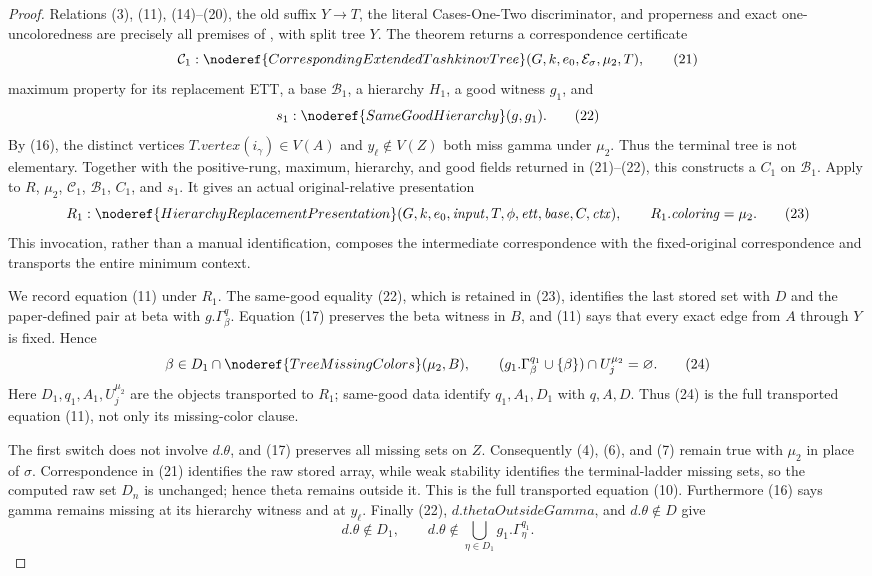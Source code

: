\begin{proof}
Relations (3), (11), (14)--(20), the old suffix $Y\to T$, the literal
Cases-One-Two discriminator, and properness and exact
one-uncoloredness are precisely all premises of
, with split tree $Y$.  The
theorem returns a correspondence certificate
\[
 \mathcal C_1:\noderef{CorrespondingExtendedTashkinovTree}
       (G,k,e_0,\mathcal E_\sigma,\mu_2,T),                    \tag{21}
\]
maximum property for its replacement ETT, a base $\mathcal B_1$, a
hierarchy $H_1$, a good witness $g_1$, and
\[
                    s_1:\noderef{SameGoodHierarchy}(g,g_1).   \tag{22}
\]
By (16), the distinct vertices
$T.\mathit{vertex}(i_\gamma)\in V(A)$ and $y_\ell\notin V(Z)$
both miss gamma under $\mu_2$.  Thus the terminal tree is not elementary.
Together with the positive-rung, maximum, hierarchy, and good fields
returned in (21)--(22), this constructs a
 $C_1$ on $\mathcal B_1$.
Apply  to $R$, $\mu_2$,
$\mathcal C_1$, $\mathcal B_1$, $C_1$, and $s_1$.  It gives an actual
original-relative presentation
\[
 R_1:\noderef{HierarchyReplacementPresentation}
       (G,k,e_0,\mathit{input},T,\phi,\mathit{ett},\mathit{base},C,
        \mathit{ctx}),\qquad R_1.\mathit{coloring}=\mu_2.      \tag{23}
\]
This invocation, rather than a manual identification, composes the
intermediate correspondence with the fixed-original correspondence and
transports the entire minimum context.

We record equation (11) under $R_1$.  The same-good equality (22), which
is retained in (23), identifies the last stored set with $D$ and the
paper-defined pair at beta with $g.\Gamma^q_\beta$.  Equation (17)
preserves the beta witness in $B$, and (11) says that every exact edge
from $A$ through $Y$ is fixed.  Hence
\[
 \beta\in D_1\cap\noderef{TreeMissingColors}(\mu_2,B),\qquad
 (g_1.\Gamma^{q_1}_\beta\cup\{\beta\})
      \cap U_j^{\mu_2}=\varnothing.                            \tag{24}
\]
Here $D_1,q_1,A_1,U_j^{\mu_2}$ are the objects transported to $R_1$;
same-good data identify $q_1,A_1,D_1$ with $q,A,D$.  Thus (24) is the
full transported equation (11), not only its missing-color clause.

The first switch does not involve $d.\theta$, and (17) preserves all
missing sets on $Z$.  Consequently (4), (6), and (7) remain true with
$\mu_2$ in place of $\sigma$.  Correspondence in (21) identifies the
raw stored array, while weak stability identifies the terminal-ladder
missing sets, so the computed raw set $D_n$ is unchanged; hence theta
remains outside it.  This is the full transported equation (10).
Furthermore (16) says gamma remains missing at its hierarchy witness
and at $y_\ell$.  Finally (22), $d.\mathit{thetaOutsideGamma}$, and
$d.\theta\notin D$ give
\[
 d.\theta\notin D_1,\qquad
 d.\theta\notin\bigcup_{\eta\in D_1}g_1.\Gamma^{q_1}_\eta.    \tag{25}
\]


\end{proof}
